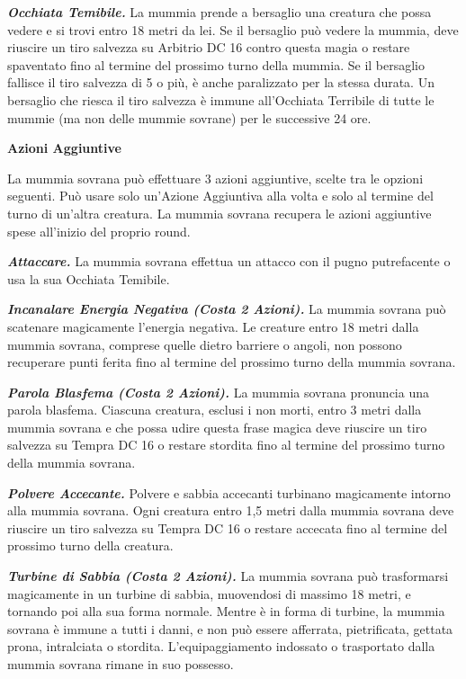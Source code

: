 \begin{multicols}{2}
\emph{\textbf{Occhiata Temibile.}} La mummia prende a bersaglio una
creatura che possa vedere e si trovi entro 18 metri da lei. Se il
bersaglio può vedere la mummia, deve riuscire un tiro salvezza su Arbitrio DC 16 contro questa magia o restare spaventato fino al termine
del prossimo turno della mummia. Se il bersaglio fallisce il tiro
salvezza di 5 o più, è anche paralizzato per la stessa durata. Un
bersaglio che riesca il tiro salvezza è immune all'Occhiata Terribile di
tutte le mummie (ma non delle mummie sovrane) per le successive 24 ore.

\textbf{Azioni Aggiuntive}

La mummia sovrana può effettuare 3 azioni aggiuntive, scelte tra le
opzioni seguenti. Può usare solo un'Azione Aggiuntiva alla volta e
solo al termine del turno di un'altra creatura. La mummia sovrana
recupera le azioni aggiuntive spese all'inizio del proprio round.

\emph{\textbf{Attaccare.}} La mummia sovrana effettua un attacco con il
pugno putrefacente o usa la sua Occhiata Temibile.

\emph{\textbf{Incanalare Energia Negativa (Costa 2 Azioni).}} La mummia
sovrana può scatenare magicamente l'energia negativa. Le creature entro
18 metri dalla mummia sovrana, comprese quelle dietro barriere o angoli,
non possono recuperare punti ferita fino al termine del prossimo turno
della mummia sovrana.

\emph{\textbf{Parola Blasfema (Costa 2 Azioni).}} La mummia sovrana
pronuncia una parola blasfema. Ciascuna creatura, esclusi i non morti,
entro 3 metri dalla mummia sovrana e che possa udire questa frase magica
deve riuscire un tiro salvezza su Tempra DC 16 o restare stordita
fino al termine del prossimo turno della mummia sovrana.

\emph{\textbf{Polvere Accecante.}} Polvere e sabbia accecanti turbinano
magicamente intorno alla mummia sovrana. Ogni creatura entro 1,5 metri
dalla mummia sovrana deve riuscire un tiro salvezza su Tempra DC
16 o restare accecata fino al termine del prossimo turno della creatura.

\emph{\textbf{Turbine di Sabbia (Costa 2 Azioni).}} La mummia sovrana
può trasformarsi magicamente in un turbine di sabbia, muovendosi di
massimo 18 metri, e tornando poi alla sua forma normale. Mentre è in
forma di turbine, la mummia sovrana è immune a tutti i danni, e non può
essere afferrata, pietrificata, gettata prona, intralciata o stordita.
L'equipaggiamento indossato o trasportato dalla mummia sovrana rimane in
suo possesso.




\end{multicols}
